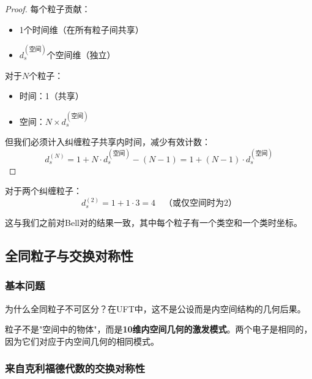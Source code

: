 \begin{proof}
每个粒子贡献：
\begin{itemize}
    \item 1个时间维（在所有粒子间共享）
    \item $d_s^{(\text{空间})}$个空间维（独立）
\end{itemize}

对于$N$个粒子：
\begin{itemize}
    \item 时间：1（共享）
    \item 空间：$N \times d_s^{(\text{空间})}$
\end{itemize}

但我们必须计入纠缠粒子共享内时间，减少有效计数：
\begin{equation}
    d_s^{(N)} = 1 + N \cdot d_s^{(\text{空间})} - (N-1) = 1 + (N-1) \cdot d_s^{(\text{空间})}
\end{equation}
\end{proof}

\begin{example}[两粒子系统]
对于两个纠缠粒子：
\begin{equation}
    d_s^{(2)} = 1 + 1 \cdot 3 = 4 \quad \text{（或仅空间时为2）}
\end{equation}

这与我们之前对Bell对的结果一致，其中每个粒子有一个类空和一个类时坐标。
\end{example}

\subsection{全同粒子与交换对称性}

\subsubsection{基本问题}

为什么全同粒子不可区分？在UFT中，这不是公设而是内空间结构的几何后果。

\begin{insight}[粒子作为内空间的激发]
粒子不是"空间中的物体"，而是\textbf{10维内空间几何的激发模式}。两个电子是相同的，因为它们对应于内空间几何的相同模式。
\end{insight}

\subsubsection{来自克利福德代数的交换对称性}

